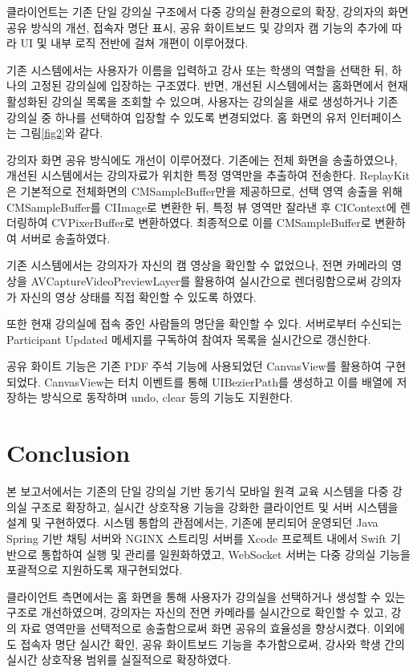 \documentclass[pdflatex,sn-mathphys-num]{sn-jnl}%
\theoremstyle{thmstyleone}%
\theoremstyle{thmstyletwo}%
\theoremstyle{thmstylethree}%
\begin{document}
클라이언트는 기존 단일 강의실 구조에서 다중 강의실 환경으로의 확장, 강의자의 화면 공유 방식의 개선, 접속자 명단 표시, 공유 화이트보드 및 강의자 캠 기능의 추가에 따라 UI 및 내부 로직 전반에 걸쳐 개편이 이루어졌다.

기존 시스템에서는 사용자가 이름을 입력하고 강사 또는 학생의 역할을 선택한 뒤, 하나의 고정된 강의실에 입장하는 구조였다. 반면, 개선된 시스템에서는 홈화면에서 현재 활성화된 강의실 목록을 조회할 수 있으며, 사용자는 강의실을 새로 생성하거나 기존 강의실 중 하나를 선택하여 입장할 수 있도록 변경되었다. 홈 화면의 유저 인터페이스는 그림\ref{fig2}와 같다.

강의자 화면 공유 방식에도 개선이 이루어졌다. 기존에는 전체 화면을 송출하였으나, 개선된 시스템에서는 강의자료가 위치한 특정 영역만을 추출하여 전송한다. ReplayKit\cite{ReplayKit}은 기본적으로 전체화면의 CMSampleBuffer만을 제공하므로, 선택 영역 송출을 위해 CMSampleBuffer를 CIImage로 변환한 뒤, 특정 뷰 영역만 잘라낸 후 CIContext에 렌더링하여 CVPixerBuffer로 변환하였다. 최종적으로 이를 CMSampleBuffer로 변환하여 서버로 송출하였다.

기존 시스템에서는 강의자가 자신의 캠 영상을 확인할 수 없었으나, 전면 카메라의 영상을 AVCaptureVideoPreviewLayer를 활용하여 실시간으로 렌더링함으로써 강의자가 자신의 영상 상태를 직접 확인할 수 있도록 하였다.

또한 현재 강의실에 접속 중인 사람들의 명단을 확인할 수 있다. 서버로부터 수신되는 Participant Updated 메세지를 구독하여 참여자 목록을 실시간으로 갱신한다.

공유 화이트 기능은 기존 PDF 주석 기능에 사용되었던 CanvasView를 활용하여 구현되었다. CanvasView는 터치 이벤트를 통해 UIBezierPath를 생성하고 이를 배열에 저장하는 방식으로 동작하며 undo, clear 등의 기능도 지원한다.

\section{Conclusion}\label{sec4}

본 보고서에서는 기존의 단일 강의실 기반 동기식 모바일 원격 교육 시스템을 다중 강의실 구조로 확장하고, 실시간 상호작용 기능을 강화한 클라이언트 및 서버 시스템을 설계 및 구현하였다. 시스템 통합의 관점에서는, 기존에 분리되어 운영되던 Java Spring 기반 채팅 서버와 NGINX 스트리밍 서버를 Xcode 프로젝트 내에서 Swift 기반으로 통합하여 실행 및 관리를 일원화하였고, WebSocket 서버는 다중 강의실 기능을 포괄적으로 지원하도록 재구현되었다.

클라이언트 측면에서는 홈 화면을 통해 사용자가 강의실을 선택하거나 생성할 수 있는 구조로 개선하였으며, 강의자는 자신의 전면 카메라를 실시간으로 확인할 수 있고, 강의 자료 영역만을 선택적으로 송출함으로써 화면 공유의 효율성을 향상시켰다. 이외에도 접속자 명단 실시간 확인, 공유 화이트보드 기능을 추가함으로써, 강사와 학생 간의 실시간 상호작용 범위를 실질적으로 확장하였다.
\end{document}
